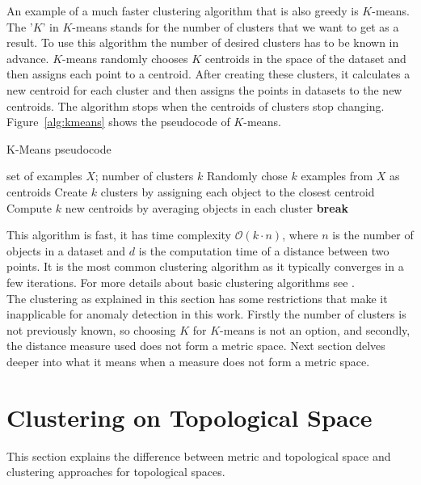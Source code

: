 \documentclass[thesis=B,english]{FITthesis}[2012/10/20]
\begin{document}
An example of a much faster clustering algorithm that is also greedy is $K$-means. 
The '$K$' in $K$-means stands for the number of clusters that we want to get as a result.
To use this algorithm the number of desired clusters has to be known in advance.
$K$-means randomly chooses $K$ centroids in the space of the dataset and then assigns each point to a centroid.
After creating these clusters, it calculates a new centroid for each cluster and then assigns the points in datasets to the new centroids.
The algorithm stops when the centroids of clusters stop changing.
Figure~\ref{alg:kmeans} shows the pseudocode of $K$-means.
\begin{algorithm}\label{alg:kmeans}
    \caption{K-Means pseudocode}
    \label{k_mean_pseudocode}
    \begin{algorithmic}[1]
        \INPUT set of examples $X$; number of clusters $k$
        \STATE Randomly chose $k$ examples from $X$ as centroids
            \STATE Create $k$ clusters by assigning each object to the closest centroid
            \STATE Compute $k$ new centroids by averaging objects in each cluster
                \STATE \textbf{break}
            \ENDIF
        \ENDWHILE
    \end{algorithmic}
\end{algorithm} 

This algorithm is fast, it has time complexity $\mathcal{O}(k \cdot n)$, where $n$ is the number of objects in a dataset and $d$ is the computation time of a distance between two points.
It is the most common clustering algorithm as it typically converges in a few iterations.
For more details about basic clustering algorithms see \cite{guttag2016introduction}.\\

The clustering as explained in this section has some restrictions that make it inapplicable for anomaly detection in this work.
Firstly the number of clusters is not previously known, so choosing $K$ for $K$-means is not an option, and secondly, the distance measure used does not form a metric space.
Next section delves deeper into what it means when a measure does not form a metric space.

\section{Clustering on Topological Space}\label{sec:cluster_topo}
This section explains the difference between metric and topological space and clustering approaches for topological spaces. \\
\end{document}
